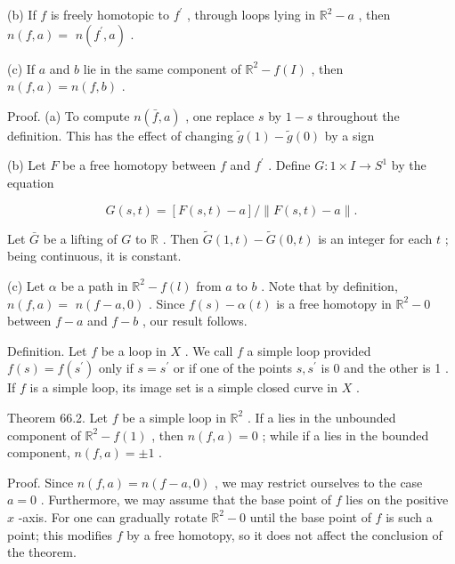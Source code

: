 (b) If \(f\) is freely homotopic to \({f}^{\prime }\) , through loops lying in \({\mathbb{R}}^{2} - a\) , then \(n\left( {f,a}\right)  =\)  \(n\left( {{f}^{\prime },a}\right)\) .

(c) If \(a\) and \(b\) lie in the same component of \({\mathbb{R}}^{2} - f\left( I\right)\) , then \(n\left( {f,a}\right)  = n\left( {f,b}\right)\) .

Proof. (a) To compute \(n\left( {\bar{f},a}\right)\) , one replace \(s\) by \(1 - s\) throughout the definition. This has the effect of changing \(\widetilde{g}\left( 1\right)  - \widetilde{g}\left( 0\right)\) by a sign

(b) Let \(F\) be a free homotopy between \(f\) and \({f}^{\prime }\) . Define \(G : 1 \times  I \rightarrow  {S}^{1}\) by the equation

\[
G\left( {s,t}\right)  = \left\lbrack  {F\left( {s,t}\right)  - a}\right\rbrack  /\parallel F\left( {s,t}\right)  - a\parallel .
\]

Let \(\bar{G}\) be a lifting of \(G\) to \(\mathbb{R}\) . Then \(\widetilde{G}\left( {1,t}\right)  - \widetilde{G}\left( {0,t}\right)\) is an integer for each \(t\) ; being continuous, it is constant.

(c) Let \(\alpha\) be a path in \({\mathbb{R}}^{2} - f\left( l\right)\) from \(a\) to \(b\) . Note that by definition, \(n\left( {f,a}\right)  =\)  \(n\left( {f - a,0}\right)\) . Since \(f\left( s\right)  - \alpha \left( t\right)\) is a free homotopy in \({\mathbb{R}}^{2} - 0\) between \(f - a\) and \(f - b\) , our result follows.

Definition. Let \(f\) be a loop in \(X\) . We call \(f\) a simple loop provided \(f\left( s\right)  = f\left( {s}^{\prime }\right)\) only if \(s = {s}^{\prime }\) or if one of the points \(s,{s}^{\prime }\) is 0 and the other is 1 . If \(f\) is a simple loop, its image set is a simple closed curve in \(X\) .

Theorem 66.2. Let \(f\) be a simple loop in \({\mathbb{R}}^{2}\) . If a lies in the unbounded component of \({\mathbb{R}}^{2} - f\left( 1\right)\) , then \(n\left( {f,a}\right)  = 0\) ; while if a lies in the bounded component, \(n\left( {f,a}\right)  =  \pm  1\) .

Proof. Since \(n\left( {f,a}\right)  = n\left( {f - a,0}\right)\) , we may restrict ourselves to the case \(a = 0\) . Furthermore, we may assume that the base point of \(f\) lies on the positive \(x\) -axis. For one can gradually rotate \({\mathbb{R}}^{2} - 0\) until the base point of \(f\) is such a point; this modifies \(f\) by a free homotopy, so it does not affect the conclusion of the theorem.

